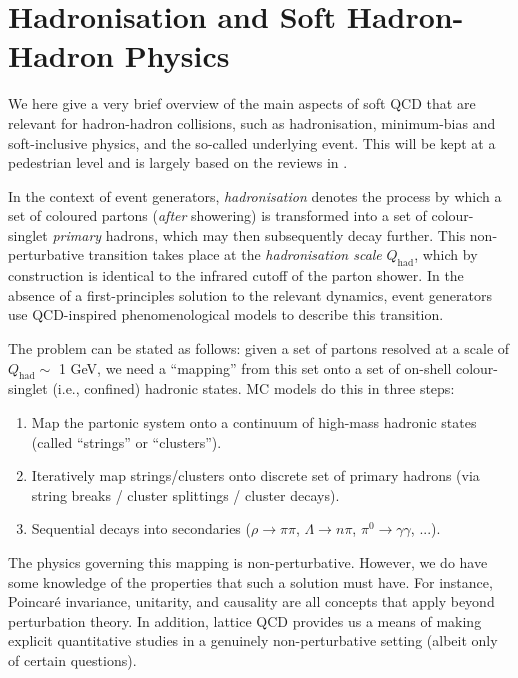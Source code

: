 \section{Hadronisation and Soft Hadron-Hadron Physics \label{sec:soft}}
%
We here give a very brief overview of the main aspects of soft
QCD that are relevant for hadron-hadron collisions, such as
hadronisation, minimum-bias and soft-inclusive physics, and
the so-called underlying event. This will be kept at a
pedestrian level and is largely based on the reviews in
\cite{pdg2012,Buckley:2011ms,Skands:2011pf}. 

%
%
%
%
In the context of event generators,  \emph{hadronisation} 
denotes the process by which a set of coloured partons (\emph{after}
showering) is 
transformed into a set of colour-singlet \emph{primary} hadrons, which
may then subsequently decay further.  
This non-perturbative transition takes place at the \emph{hadronisation
scale} $Q_{\mathrm{had}}$, which by construction 
is identical to the infrared cutoff of the parton
shower.  
In the absence of a first-principles solution to the relevant
dynamics, event generators use QCD-inspired phenomenological models to
describe this transition. 

%
The problem can
be stated as follows: given a set of partons resolved at a scale of
$Q_\mathrm{had}\sim$ 1 GeV, we need a ``mapping'' 
from this set onto a set of on-shell colour-singlet (i.e., confined)
hadronic states. MC models do this in three steps:
%
\begin{enumerate}
\item Map the partonic system  onto a continuum of high-mass 
hadronic states (called  ``strings'' or ``clusters'').
\item Iteratively map strings/clusters onto discrete set of primary
  hadrons (via string breaks / cluster splittings / cluster decays).
\item Sequential decays into secondaries ($\rho \to
  \pi\pi$, $\Lambda\to n \pi$, $\pi^0 \to \gamma\gamma$, ...).  
\end{enumerate}
The physics governing this mapping is non-perturbative. However, 
we do have some 
knowledge of the properties that such a solution must have. 
For instance, Poincar\'e invariance, unitarity, and 
causality are all concepts that apply beyond 
perturbation theory. 
In addition, lattice QCD provides us a means
of making explicit quantitative studies in a genuinely non-perturbative
setting (albeit only of certain questions). 


